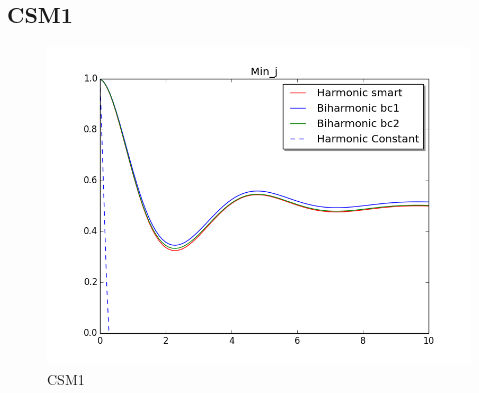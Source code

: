 \subsection*{CSM1}
\begin{figure}[H]
\label{fig:fluid_structure}
\caption{CSM1}
\includegraphics[scale=0.60, trim={0mm 0mm 0mm 0mm},clip]{./Verification_Validation/Mesh_motion_results/CSM1.png}
\end{figure}
